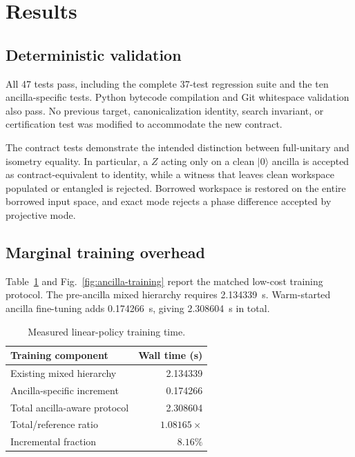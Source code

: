 \section{Results}

\subsection{Deterministic validation}

All 47 tests pass, including the complete 37-test regression suite and the ten ancilla-specific tests. Python bytecode compilation and Git whitespace validation also pass. No previous target, canonicalization identity, search invariant, or certification test was modified to accommodate the new contract.

The contract tests demonstrate the intended distinction between full-unitary and isometry equality. In particular, a $Z$ acting only on a clean $\lvert0\rangle$ ancilla is accepted as contract-equivalent to identity, while a witness that leaves clean workspace populated or entangled is rejected. Borrowed workspace is restored on the entire borrowed input space, and exact mode rejects a phase difference accepted by projective mode.

\subsection{Marginal training overhead}

Table~\ref{tab:training-time} and Fig.~\ref{fig:ancilla-training} report the matched low-cost training protocol. The pre-ancilla mixed hierarchy requires \SI{2.134339}{\second}. Warm-started ancilla fine-tuning adds \SI{0.174266}{\second}, giving \SI{2.308604}{\second} in total.

\begin{table}[t]
\caption{Measured linear-policy training time.}
\label{tab:training-time}
\centering
\begin{tabular}{lr}
\toprule
Training component & Wall time (s)\\
\midrule
Existing mixed hierarchy & 2.134339\\
Ancilla-specific increment & 0.174266\\
Total ancilla-aware protocol & 2.308604\\
\midrule
Total/reference ratio & $1.08165\times$\\
Incremental fraction & $8.16\%$\\
\bottomrule
\end{tabular}
\end{table}

